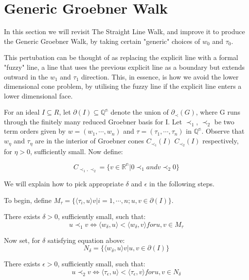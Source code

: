 \documentclass[12pt,a4paper]{report}
\begin{document}
\section{Generic Groebner Walk}
In this section we will revisit The Straight Line Walk, and improve it to produce the Generic Groebner Walk, by taking certain "generic" choices of $w_{0}$ and $\tau_{0}$.

This pertubation can be thought of as replacing the explicit line with a formal "fuzzy" line, a line that uses the previous explicit line as a boundary but extends outward in the $w_{1}$ and $\tau_{1}$ direction. This, in essence, is how we avoid the lower dimensional cone problem, by utilising the fuzzy line if the explicit line enters a lower dimensional face.

For an ideal $I \subseteq R$, let $\partial (I) \subseteq \mathbb{{Q}^{n}}$ denote the union of $\partial_{\prec} (G)$, where G runs through the finitely many reduced Groebner basis for I. Let $\prec_{1}$, $\prec_{2}$ be two term orders given by $w = (w_{1}, \cdots, w_{n})$ and $\tau = (\tau_{1}, \cdots, \tau_{n})$ in $\mathbb{{Q}^{n}}$. Observe that $w_{\eta}$ and $\tau_{\eta}$ are in the interior of Groebner cones $C_{{\prec}_{1}} (I)$ $C_{{\prec}_{2}} (I)$ respectively, for $\eta > 0$, sufficiently small. Now define:

\begin{equation*}
    C_{\prec_{1}, \prec_{2}} = \{ v \in \mathbb{{R}^{n}} | 0 \prec_{1} and v \prec_{2} 0 \}
\end{equation*}

We will explain how to pick appropriate $\delta$ and $\epsilon$ in the following steps.

To begin, define $M_{\tau} = \{ \langle \tau_{i}, u \rangle v | i = 1, \cdots, n; u, v \in \partial (I) \}$.

There exists $\delta > 0$, sufficiently small, such that:
\begin{equation*}
    u \prec_{1} v \Longleftrightarrow \langle w_{\delta}, u \rangle < \langle w_{\delta}, v \rangle for u, v \in M_{\tau}
\end{equation*}

Now set, for $\delta$ satisfying equation above:
\begin{equation*}
    N_{\delta} = \{ \langle w_{\delta}, u \rangle v | u, v \in \partial (I) \}
\end{equation*}

There exists $\epsilon > 0$, sufficiently small, such that:
\begin{equation*}
    u \prec_{2} v \Longleftrightarrow \langle \tau_{\epsilon}, u \rangle < \langle \tau_{\epsilon}, v \rangle for u, v \in N_{\delta}
\end{equation*}
\end{document}
